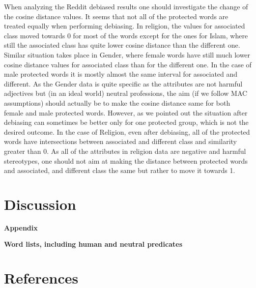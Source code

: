 \documentclass[
  10pt,
  dvipsnames,enabledeprecatedfontcommands]{scrartcl}
\begin{document}
When analyzing the Reddit debiased results one should investigate the
change of the cosine distance values. It seems that not all of the
protected words are treated equally when performing debiasing. In
religion, the values for associated class moved towards 0 for most of
the words except for the ones for Islam, where still the associated
class has quite lower cosine distance than the different one. Similar
situation takes place in Gender, where female words have still much
lower cosine distance values for associated class than for the different
one. In the case of male protected words it is mostly almost the same
interval for associated and different. As the Gender data is quite
specific as the attributes are not harmful adjectives but (in an ideal
world) neutral professions, the aim (if we follow MAC assumptions)
should actually be to make the cosine distance same for both female and
male protected words. However, as we pointed out the situation after
debiasing can sometimes be better only for one protected group, which is
not the desired outcome. In the case of Religion, even after debiasing,
all of the protected words have intersections between associated and
different class and similarity greater than 0. As all of the attributes
in religion data are negative and harmful stereotypes, one should not
aim at making the distance between protected words and associated, and
different class the same but rather to move it towards 1.

\hypertarget{discussion}{%
\section{Discussion}\label{discussion}}

\newpage

\noindent \huge  \textbf{Appendix} \normalsize

\noindent \Large \textbf{Word lists, including human and neutral predicates}
\normalsize

\hypertarget{references}{%
\section*{References}\label{references}}

\vspace{-3mm}
\end{document}
